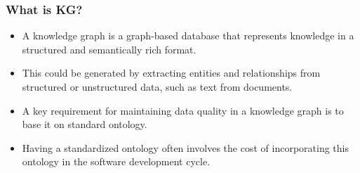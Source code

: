 \begin{frame}[fragile]\frametitle{What is KG?}

\begin{itemize}
\item A knowledge graph is a graph-based database that represents knowledge in a structured and semantically rich format. 
\item This could be generated by extracting entities and relationships from structured or unstructured data, such as text from documents. 
\item A key requirement for maintaining data quality in a knowledge graph is to base it on standard ontology. 
\item Having a standardized ontology often involves the cost of incorporating this ontology in the software development cycle.
\end{itemize}

\end{frame}



